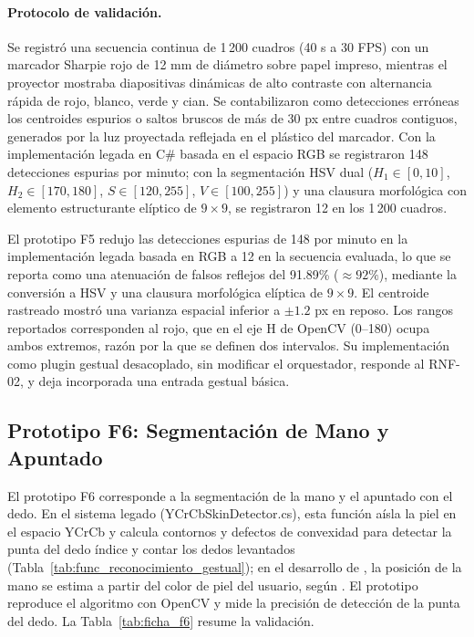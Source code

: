 \paragraph{Protocolo de validación.} Se registró una secuencia continua de 1\,200 cuadros (40 s a 30 FPS) con un marcador Sharpie rojo de 12 mm de diámetro sobre papel impreso, mientras el proyector mostraba diapositivas dinámicas de alto contraste con alternancia rápida de rojo, blanco, verde y cian. Se contabilizaron como detecciones erróneas los centroides espurios o saltos bruscos de más de 30 px entre cuadros contiguos, generados por la luz proyectada reflejada en el plástico del marcador. Con la implementación legada en C\# basada en el espacio RGB se registraron 148 detecciones espurias por minuto; con la segmentación HSV dual ($H_1 \in [0, 10]$, $H_2 \in [170, 180]$, $S \in [120, 255]$, $V \in [100, 255]$) y una clausura morfológica con elemento estructurante elíptico de $9 \times 9$, se registraron 12 en los 1\,200 cuadros.
 
El prototipo F5 redujo las detecciones espurias de 148 por minuto en la implementación legada basada en RGB a 12 en la secuencia evaluada, lo que se reporta como una atenuación de falsos reflejos del 91.89\% ($\approx 92\%$), mediante la conversión a HSV y una clausura morfológica elíptica de $9 \times 9$. El centroide rastreado mostró una varianza espacial inferior a $\pm 1.2$ px en reposo. Los rangos reportados corresponden al rojo, que en el eje H de OpenCV (0--180) ocupa ambos extremos, razón por la que se definen dos intervalos. Su implementación como plugin gestual desacoplado, sin modificar el orquestador, responde al RNF-02, y deja incorporada una entrada gestual básica.
 
\subsection{Prototipo F6: Segmentación de Mano y Apuntado}
 
El prototipo F6 corresponde a la segmentación de la mano y el apuntado con el dedo. En el sistema legado (YCrCbSkinDetector.cs), esta función aísla la piel en el espacio YCrCb y calcula contornos y defectos de convexidad para detectar la punta del dedo índice y contar los dedos levantados (Tabla~\ref{tab:func_reconocimiento_gestual}); en el desarrollo de \cite{contreras2019desarrollo}, la posición de la mano se estima a partir del color de piel del usuario, según \cite{ibaceta2023evaluacion}. El prototipo reproduce el algoritmo con OpenCV y mide la precisión de detección de la punta del dedo. La Tabla~\ref{tab:ficha_f6} resume la validación.
 
